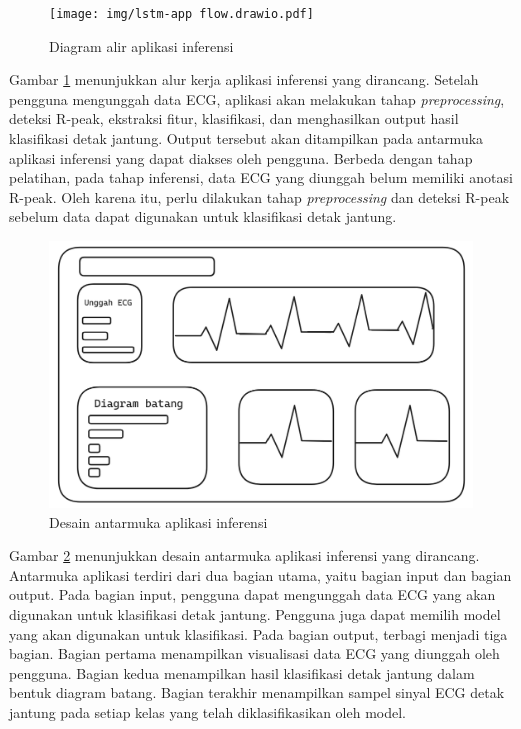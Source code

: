 \begin{figure}[H]
	\centering
	\texttt{[image: img/lstm-app flow.drawio.pdf]}
	\caption{Diagram alir aplikasi inferensi}
	\label{fig:flowchart-inferensi}
\end{figure}

Gambar \ref{fig:flowchart-inferensi} menunjukkan alur kerja aplikasi inferensi yang dirancang.
Setelah pengguna mengunggah data ECG, aplikasi akan melakukan tahap \textit{preprocessing}, deteksi R-peak, ekstraksi fitur, klasifikasi, dan menghasilkan output hasil klasifikasi detak jantung.
Output tersebut akan ditampilkan pada antarmuka aplikasi inferensi yang dapat diakses oleh pengguna.
Berbeda dengan tahap pelatihan, pada tahap inferensi, data ECG yang diunggah belum memiliki anotasi R-peak.
Oleh karena itu, perlu dilakukan tahap \textit{preprocessing} dan deteksi R-peak sebelum data dapat digunakan untuk klasifikasi detak jantung.

\begin{figure}[H]
	\centering
	\includegraphics[width=.8\textwidth]{img/2024-06-24_12-19.png}
	\caption{Desain antarmuka aplikasi inferensi}
	\label{fig:lofi-inferensi}
\end{figure}

Gambar \ref{fig:lofi-inferensi} menunjukkan desain antarmuka aplikasi inferensi yang dirancang.
Antarmuka aplikasi terdiri dari dua bagian utama, yaitu bagian input dan bagian output.
Pada bagian input, pengguna dapat mengunggah data ECG yang akan digunakan untuk klasifikasi detak jantung.
Pengguna juga dapat memilih model yang akan digunakan untuk klasifikasi.
Pada bagian output, terbagi menjadi tiga bagian.
Bagian pertama menampilkan visualisasi data ECG yang diunggah oleh pengguna.
Bagian kedua menampilkan hasil klasifikasi detak jantung dalam bentuk diagram batang.
Bagian terakhir menampilkan sampel sinyal ECG detak jantung pada setiap kelas yang telah diklasifikasikan oleh model.




